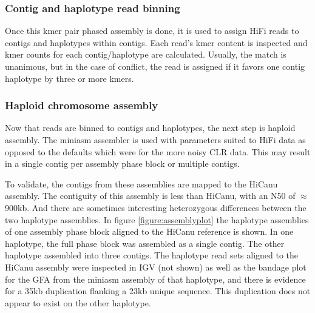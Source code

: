 \subsubsection{Contig and haplotype read binning}

\par{
Once this kmer pair phased assembly is done, it is used to assign HiFi reads to contigs and haplotypes within contigs. Each read's kmer content is inspected and kmer counts for each contig/haplotype are calculated. Usually, the match is unanimous, but in the case of conflict, the read is assigned if it favors one contig haplotype by three or more kmers. 
}

\subsubsection{Haploid chromosome assembly}

\par{
Now that reads are binned to contigs and haplotypes, the next step is haploid assembly. The miniasm assembler is used with parameters suited to HiFi data as opposed to the defaults which were for the more noisy CLR data\cite{miniasm}. This may result in a single contig per assembly phase block or multiple contigs. }

\par{ To validate, the contigs from these assemblies are mapped to the HiCanu assembly. The contiguity of this assembly is less than HiCanu, with an N50 of $\approx$900kb. And there are sometimes interesting heterozygous differences between the two haplotype assemblies. In figure \ref{figure:assemblyplot} the haplotype assemblies of one assembly phase block aligned to the HiCanu reference is shown. In one haplotype, the full phase block was assembled as a single contig. The other haplotype assembled into three contigs. The haplotype read sets aligned to the HiCanu assembly were inspected in IGV (not shown) as well as the bandage plot for the GFA from the miniasm assembly of that haplotype, and there is evidence for a 35kb duplication flanking a 23kb unique sequence\cite{bandage}. This duplication does not appear to exist on the other haplotype.
}

